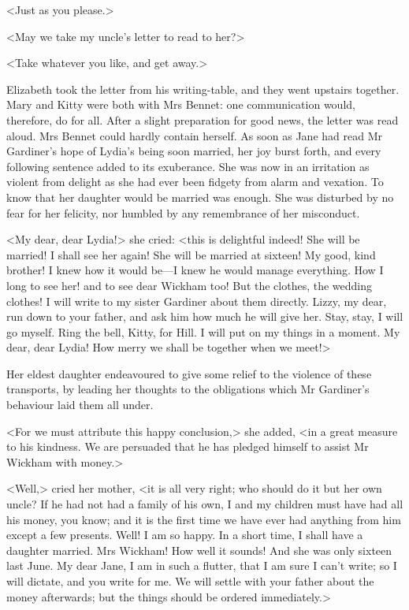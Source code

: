 <Just as you please.>

<May we take my uncle's letter to read to her?>

<Take whatever you like, and get away.>

Elizabeth took the letter from his writing-table, and they went upstairs together. Mary and Kitty were both with Mrs Bennet: one communication would, therefore, do for all. After a slight preparation for good news, the letter was read aloud. Mrs Bennet could hardly contain herself. As soon as Jane had read Mr Gardiner's hope of Lydia's being soon married, her joy burst forth, and every following sentence added to its exuberance. She was now in an irritation as violent from delight as she had ever been fidgety from alarm and vexation. To know that her daughter would be married was enough. She was disturbed by no fear for her felicity, nor humbled by any remembrance of her misconduct.

<My dear, dear Lydia!> she cried: <this is delightful indeed! She will be married! I shall see her again! She will be married at sixteen! My good, kind brother! I knew how it would be—I knew he would manage everything. How I long to see her! and to see dear Wickham too! But the clothes, the wedding clothes! I will write to my sister Gardiner about them directly. Lizzy, my dear, run down to your father, and ask him how much he will give her. Stay, stay, I will go myself. Ring the bell, Kitty, for Hill. I will put on my things in a moment. My dear, dear Lydia! How merry we shall be together when we meet!>

Her eldest daughter endeavoured to give some relief to the violence of these transports, by leading her thoughts to the obligations which Mr Gardiner's behaviour laid them all under.

<For we must attribute this happy conclusion,> she added, <in a great measure to his kindness. We are persuaded that he has pledged himself to assist Mr Wickham with money.>

<Well,> cried her mother, <it is all very right; who should do it but her own uncle? If he had not had a family of his own, I and my children must have had all his money, you know; and it is the first time we have ever had anything from him except a few presents. Well! I am so happy. In a short time, I shall have a daughter married. Mrs Wickham! How well it sounds! And she was only sixteen last June. My dear Jane, I am in such a flutter, that I am sure I can't write; so I will dictate, and you write for me. We will settle with your father about the money afterwards; but the things should be ordered immediately.>

